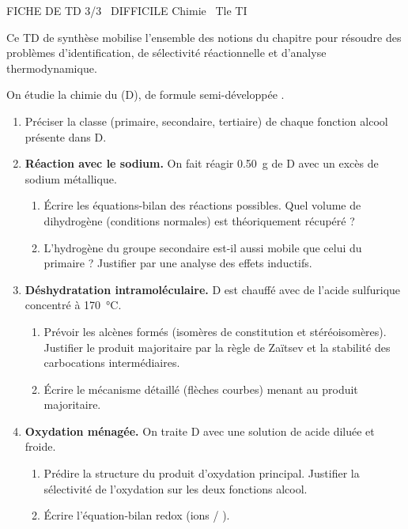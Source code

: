 \documentclass[11pt]{article}
\begin{document}
\begin{tcolorbox}[enhanced,colback=popink,colframe=popink,arc=10pt,boxrule=0pt,left=12pt,right=12pt,top=9pt,bottom=9pt]
{\color{white}\popxbold\small FICHE DE TD 3/3 \textbullet\ DIFFICILE \hfill Chimie \textbullet\ Tle TI\par}
\end{tcolorbox}
\vspace{4pt}
Ce TD de synthèse mobilise l'ensemble des notions du chapitre pour résoudre des problèmes d'identification, de sélectivité réactionnelle et d'analyse thermodynamique.

\begin{exercice}
On étudie la chimie du  (D), de formule semi-développée .
\begin{enumerate}
    \item Préciser la classe (primaire, secondaire, tertiaire) de chaque fonction alcool présente dans D.
    \item \textbf{Réaction avec le sodium.} On fait réagir \SI{0,50}{\gram} de D avec un excès de sodium métallique.
    \begin{enumerate}
        \item Écrire les équations-bilan des réactions possibles. Quel volume de dihydrogène (conditions normales) est théoriquement récupéré ?
        \item L'hydrogène du groupe  secondaire est-il aussi mobile que celui du primaire ? Justifier par une analyse des effets inductifs.
    \end{enumerate}
    \item \textbf{Déshydratation intramoléculaire.} D est chauffé avec de l'acide sulfurique concentré à \SI{170}{\celsius}.
    \begin{enumerate}
        \item Prévoir les alcènes formés (isomères de constitution et stéréoisomères). Justifier le produit majoritaire par la règle de Zaïtsev et la stabilité des carbocations intermédiaires.
        \item Écrire le mécanisme détaillé (flèches courbes) menant au produit majoritaire.
    \end{enumerate}
    \item \textbf{Oxydation ménagée.} On traite D avec une solution de  acide diluée et froide.
    \begin{enumerate}
        \item Prédire la structure du produit d'oxydation principal. Justifier la sélectivité de l'oxydation sur les deux fonctions alcool.
        \item Écrire l'équation-bilan redox (ions  / ).
    \end{enumerate}
\end{enumerate}
\end{exercice}
\end{document}
